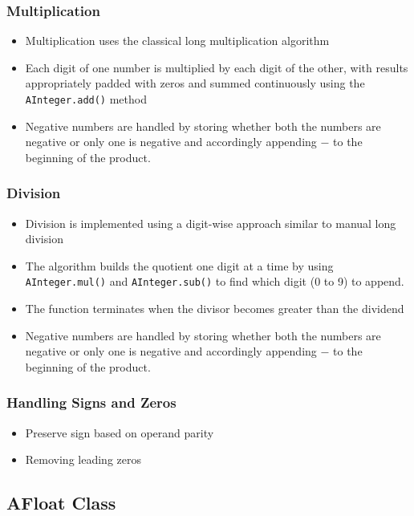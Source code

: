\documentclass[12pt]{article}
\begin{document}
\subsubsection{Multiplication}
\begin{itemize}
    \item Multiplication uses the classical long multiplication algorithm
    \item Each digit of one number is multiplied by each digit of the other, with results appropriately padded with zeros and summed continuously using the \texttt{AInteger.add()} method
    \item Negative numbers are handled by storing whether both the numbers are negative or only one is negative and accordingly appending $-$ to the beginning of the product.
\end{itemize}

\subsubsection{Division}
\begin{itemize}
    \item Division is implemented using a digit-wise approach similar to manual long division
    \item The algorithm builds the quotient one digit at a time by using \texttt{AInteger.mul()} and \texttt{AInteger.sub()} to find which digit (0 to 9) to append.
    \item The function terminates when the divisor becomes greater than the dividend
    \item Negative numbers are handled by storing whether both the numbers are negative or only one is negative and accordingly appending $-$ to the beginning of the product.
\end{itemize}

\subsubsection{Handling Signs and Zeros}
\begin{itemize}
    \item Preserve sign based on operand parity
    \item Removing leading zeros
\end{itemize}

\subsection{AFloat Class}
\end{document}
